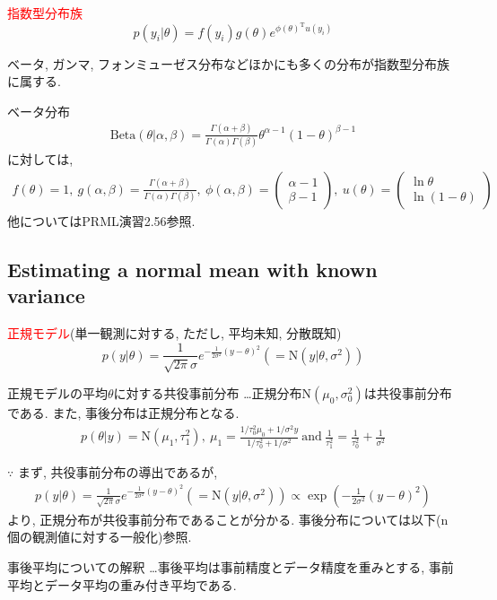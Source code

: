 \documentclass[11pt,a4pape,dvipdfmx]{jarticle}
\newcommand{\eqn}[1]{\begin{align*}#1\end{align*}}
\newcommand{\tcr}[1]{\textcolor{red}{#1}}
\begin{document}
\begin{itembox}[l]{\tcr{指数型分布族}}
\[p(y_i|\theta)=f(y_i)g(\theta)e^{\phi(\theta)^{\mathrm{T}}u(y_i)}\]
\end{itembox}

ベータ, ガンマ, フォンミューゼス分布などほかにも多くの分布が指数型分布族に属する.

ベータ分布
\eqn{\text{Beta}(\theta|\alpha,\beta)=\frac{\Gamma(\alpha+\beta)}{\Gamma(\alpha)\Gamma(\beta)}\theta^{\alpha-1}(1-\theta)^{\beta-1}}
に対しては,
\eqn{f(\theta)=1,\ g(\alpha,\beta)=\frac{\Gamma(\alpha+\beta)}{\Gamma(\alpha)\Gamma(\beta)},\ \phi(\alpha,\beta)=\left(\begin{array}{c}\alpha-1\\\beta-1\end{array}\right),\ u(\theta)=\left(\begin{array}{c}\ln\theta\\\ln(1-\theta)\end{array}\right)}
他についてはPRML演習2.56参照.


\subsection{Estimating a normal mean with known variance}
\begin{itembox}[l]{\tcr{正規モデル}(単一観測に対する, ただし, 平均未知, 分散既知)}
\[p(y|\theta)=\frac{1}{\sqrt{2\pi}\sigma}e^{-\frac{1}{2\sigma^2}(y-\theta)^2}(=\text{N}(y|\theta,\sigma^2))\]
\end{itembox}


\begin{itembox}[l]{正規モデルの平均$\theta$に対する共役事前分布}
…正規分布N$(\mu_0,\sigma_0^2)$は共役事前分布である.
また, 事後分布は正規分布となる.
\eqn{p(\theta|y)=\text{N}(\mu_1,\tau^2_1),\ \mu_1=\tfrac{1/\tau_0^2 \mu_0+1/\sigma^2 y}{1/\tau_0^2+1/\sigma^2}\ \text{and}\  \tfrac{1}{\tau_1^2}=\tfrac{1}{\tau_0^2}+\tfrac{1}{\sigma^2}}
\end{itembox}
$\because$
まず, 共役事前分布の導出であるが,
\eqn{p(y|\theta)=\frac{1}{\sqrt{2\pi}\sigma}e^{-\frac{1}{2\sigma^2}(y-\theta)^2}(=\text{N}(y|\theta,\sigma^2))\propto\exp\left(-\frac{1}{2\sigma^2}(y-\theta)^2\right)}
より, 正規分布が共役事前分布であることが分かる.
事後分布については以下(n個の観測値に対する一般化)参照.


\begin{itembox}[l]{事後平均についての解釈}
…事後平均は事前精度とデータ精度を重みとする, 事前平均とデータ平均の重み付き平均である.
\end{itembox}
\end{document}
